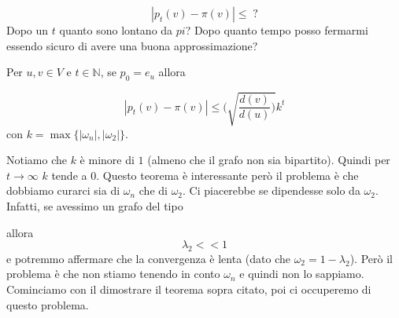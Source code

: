\documentclass[12pt]{report}
\begin{document}
$$|p_t(v) - \pi(v)| \leq \; ?$$
Dopo un $t$ quanto sono lontano da $pi$? Dopo quanto tempo posso fermarmi essendo sicuro di avere una buona approssimazione?

\begin{teo}
    Per $u,v \in V$ e $t \in \mathbb{N}$, se $p_0 = e_u$ allora

    $$|p_t(v) - \pi(v)| \leq (\sqrt{\frac{d(v)}{d(u)}   )}k^t $$
    con $k = \max\{|\omega_n|,|\omega_2|\}$.
\end{teo}
\noindent
Notiamo che $k$ è minore di $1$ (almeno che il grafo non sia bipartito). Quindi per $t \rightarrow \infty$ $k$ tende a $0$. Questo teorema è interessante però il problema è che dobbiamo curarci sia di $\omega_n$ che di $\omega_2$. Ci piacerebbe se dipendesse solo da $\omega_2$. Infatti, se avessimo un grafo del tipo

allora $$\lambda_2 << 1$$ e potremmo affermare che la convergenza è lenta (dato che $\omega_2 = 1- \lambda_2$). Però il problema è che non stiamo tenendo in conto $\omega_n$ e quindi non lo sappiamo. Cominciamo con il dimostrare il teorema sopra citato, poi ci occuperemo di questo problema.
\end{document}
